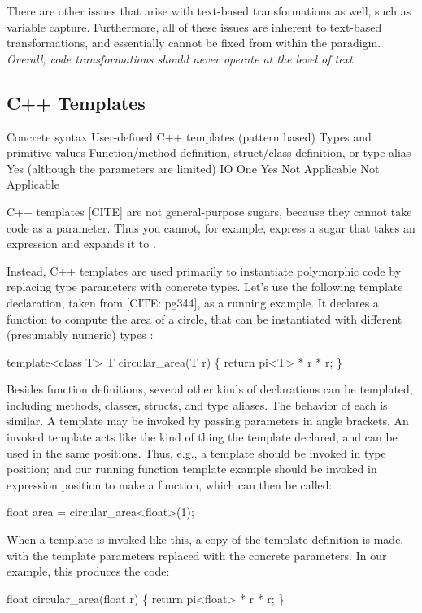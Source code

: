 There are other issues that arise with text-based transformations as
well, such as variable capture. Furthermore, all of these issues are
inherent to text-based transformations, and essentially cannot be
fixed from within the paradigm. \emph{Overall, code transformations
  should never operate at the level of text.}

\subsection{C++ Templates} \label{sec:cpp}

 Concrete syntax
 User-defined
 C++ templates (pattern based)
 Types and primitive values
 Function/method definition, struct/class definition, or type alias
 Yes (although the parameters are limited)
 IO
 One
 Yes
 Not Applicable
 Not Applicable

C++ templates [CITE] are not general-purpose sugars,
because they cannot take code as a parameter. Thus you cannot, for
example, express a sugar that takes an expression  and expands
it to .

Instead, C++ templates are used
primarily to instantiate polymorphic code by replacing type parameters
with concrete types.  Let's use the following template declaration,
taken from [CITE: pg344], as a running example. It declares a function
to compute the area of a circle, that can be instantiated with
different (presumably numeric) types : %
\begin{Codes}
template<class T>
T circular_area(T r) \{
  return pi<T> * r * r;
\}
\end{Codes}

Besides function definitions, several other kinds of declarations can
be templated, including methods, classes, structs, and type aliases.
The behavior of each is similar. A template may be invoked by passing
parameters in angle brackets. An invoked template acts like the
kind of thing the template declared, and can be used in the same
positions. Thus, e.g., a  template should be invoked in type
position; and our running function template example should be invoked
in expression position to make a function, which can then be called:
\begin{Codes}
  float area = circular_area<float>(1);
\end{Codes}
When a template is invoked like this, a copy of the template
definition is made, with the template parameters replaced with the
concrete parameters.
In our example, this produces the code:
\begin{Codes}
float circular_area(float r) \{
  return pi<float> * r * r;
\}
\end{Codes}

